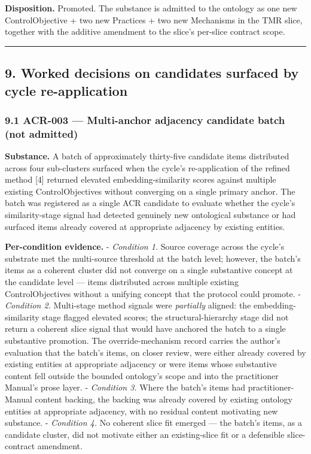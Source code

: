 \documentclass[
]{article}
\begin{document}
\textbf{Disposition.} Promoted. The substance is admitted to the
ontology as one new ControlObjective + two new Practices + two new
Mechanisms in the TMR slice, together with the additive amendment to the
slice's per-slice contract scope.

\begin{center}\rule{0.5\linewidth}{0.5pt}\end{center}

\subsection{9. Worked decisions on candidates surfaced by cycle
re-application}\label{worked-decisions-on-candidates-surfaced-by-cycle-re-application}

\subsubsection{9.1 ACR-003 --- Multi-anchor adjacency candidate batch
(not
admitted)}\label{acr-003-multi-anchor-adjacency-candidate-batch-not-admitted}

\textbf{Substance.} A batch of approximately thirty-five candidate items
distributed across four sub-clusters surfaced when the cycle's
re-application of the refined method {[}4{]} returned elevated
embedding-similarity scores against multiple existing ControlObjectives
without converging on a single primary anchor. The batch was registered
as a single ACR candidate to evaluate whether the cycle's
similarity-stage signal had detected genuinely new ontological substance
or had surfaced items already covered at appropriate adjacency by
existing entities.

\textbf{Per-condition evidence.} - \emph{Condition 1.} Source coverage
across the cycle's substrate met the multi-source threshold at the batch
level; however, the batch's items as a coherent cluster did not converge
on a single substantive concept at the candidate level --- items
distributed across multiple existing ControlObjectives without a
unifying concept that the protocol could promote. - \emph{Condition 2.}
Multi-stage method signals were \emph{partially} aligned: the
embedding-similarity stage flagged elevated scores; the
structural-hierarchy stage did not return a coherent slice signal that
would have anchored the batch to a single substantive promotion. The
override-mechanism record carries the author's evaluation that the
batch's items, on closer review, were either already covered by existing
entities at appropriate adjacency or were items whose substantive
content fell outside the bounded ontology's scope and into the
practitioner Manual's prose layer. - \emph{Condition 3.} Where the
batch's items had practitioner-Manual content backing, the backing was
already covered by existing ontology entities at appropriate adjacency,
with no residual content motivating new substance. - \emph{Condition 4.}
No coherent slice fit emerged --- the batch's items, as a candidate
cluster, did not motivate either an existing-slice fit or a defensible
slice-contract amendment.
\end{document}
